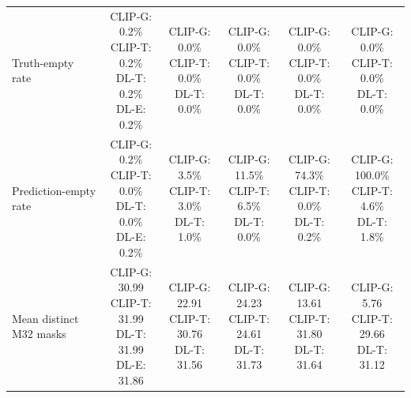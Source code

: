 \begin{table}[t]
{\begin{tabular}{lccccc}
\addlinespace[2pt]
Truth-empty rate & \shortstack[l]{\textsc{CLIP-G}: 0.2\% \\ \textsc{CLIP-T}: 0.2\% \\ \textsc{DL-T}: 0.2\% \\ \textsc{DL-E}: 0.2\%} & \shortstack[l]{\textsc{CLIP-G}: 0.0\% \\ \textsc{CLIP-T}: 0.0\% \\ \textsc{DL-T}: 0.0\%} & \shortstack[l]{\textsc{CLIP-G}: 0.0\% \\ \textsc{CLIP-T}: 0.0\% \\ \textsc{DL-T}: 0.0\%} & \shortstack[l]{\textsc{CLIP-G}: 0.0\% \\ \textsc{CLIP-T}: 0.0\% \\ \textsc{DL-T}: 0.0\%} & \shortstack[l]{\textsc{CLIP-G}: 0.0\% \\ \textsc{CLIP-T}: 0.0\% \\ \textsc{DL-T}: 0.0\%} \\
\addlinespace[2pt]
Prediction-empty rate & \shortstack[l]{\textsc{CLIP-G}: 0.2\% \\ \textsc{CLIP-T}: 0.0\% \\ \textsc{DL-T}: 0.0\% \\ \textsc{DL-E}: 0.2\%} & \shortstack[l]{\textsc{CLIP-G}: 3.5\% \\ \textsc{CLIP-T}: 3.0\% \\ \textsc{DL-T}: 1.0\%} & \shortstack[l]{\textsc{CLIP-G}: 11.5\% \\ \textsc{CLIP-T}: 6.5\% \\ \textsc{DL-T}: 0.0\%} & \shortstack[l]{\textsc{CLIP-G}: 74.3\% \\ \textsc{CLIP-T}: 0.0\% \\ \textsc{DL-T}: 0.2\%} & \shortstack[l]{\textsc{CLIP-G}: 100.0\% \\ \textsc{CLIP-T}: 4.6\% \\ \textsc{DL-T}: 1.8\%} \\
\addlinespace[2pt]
Mean distinct M32 masks & \shortstack[l]{\textsc{CLIP-G}: 30.99 \\ \textsc{CLIP-T}: 31.99 \\ \textsc{DL-T}: 31.99 \\ \textsc{DL-E}: 31.86} & \shortstack[l]{\textsc{CLIP-G}: 22.91 \\ \textsc{CLIP-T}: 30.76 \\ \textsc{DL-T}: 31.56} & \shortstack[l]{\textsc{CLIP-G}: 24.23 \\ \textsc{CLIP-T}: 24.61 \\ \textsc{DL-T}: 31.73} & \shortstack[l]{\textsc{CLIP-G}: 13.61 \\ \textsc{CLIP-T}: 31.80 \\ \textsc{DL-T}: 31.64} & \shortstack[l]{\textsc{CLIP-G}: 5.76 \\ \textsc{CLIP-T}: 29.66 \\ \textsc{DL-T}: 31.12} \\

\end{tabular}}
\end{table}
